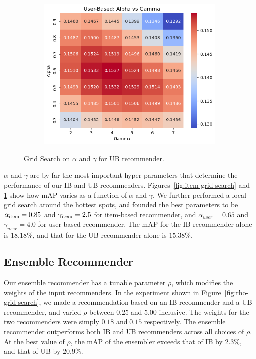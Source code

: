 \documentclass[conference]{IEEEtran}
\newcommand{\mAP}{m\textsc{AP} }
\begin{document}
\begin{figure}[htbp]
\centering
\begin{subfigure}{0.85\columnwidth}
  \centering
  \includegraphics[width=\columnwidth]{user-grid-search.png}
\end{subfigure}
\caption{Grid Search on $\alpha$ and $\gamma$ for UB recommender.}
\label{fig:user-grid-search}
\end{figure}

$\alpha$ and $\gamma$ are
by far the most important hyper-parameters that determine
the performance of our IB and UB recommenders.
Figures~\ref{fig:item-grid-search} and \ref{fig:user-grid-search} show how
\mAP varies as a function of $\alpha$ and $\gamma$. We further
performed a local grid search around the hottest spots, and founded the
best parameters to be $\alpha_{\rm item} = 0.85$ and $\gamma_{\rm item} = 2.5$
for item-based recommender, and $\alpha_{user}=0.65$ and $\gamma_{user}=4.0$
for user-based recommender. The \mAP for the IB recommender alone is
$18.18\%$, and that for the UB recommender alone is $15.38\%$.

\subsection{Ensemble Recommender}

Our ensemble recommender has a tunable parameter $\rho$, which
modifies the weights of the input recommenders. In the experiment
shown in Figure~\ref{fig:rho-grid-search}, we made a recommendation based
on an IB recommender and a UB recommender, and varied $\rho$ between $0.25$
and $5.00$ inclusive. The weights for the two recommenders were simply
$0.18$ and $0.15$ respectively. The ensemble recommender outperforms
both IB and UB recommenders across all choices of $\rho$. At the best
value of $\rho$, the \mAP of the ensembler exceeds that of IB by $2.3\%$,
and that of UB by $20.9\%$.
\end{document}

